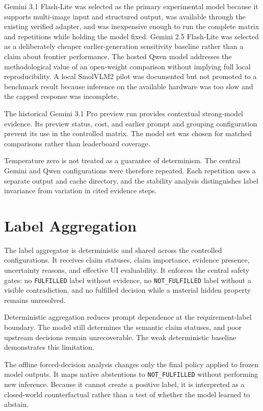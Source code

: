 Gemini 3.1 Flash-Lite was selected as the primary experimental model because it
supports multi-image input and structured output, was available through the
existing verified adapter, and was inexpensive enough to run the complete
matrix and repetitions while holding the model fixed. Gemini 2.5 Flash-Lite was
selected as a deliberately cheaper earlier-generation sensitivity baseline
rather than a claim about frontier performance. The hosted Qwen model addresses
the methodological value of an open-weight comparison without implying full
local reproducibility. A local SmolVLM2 pilot was documented but not promoted
to a benchmark result because inference on the available hardware was too slow
and the capped response was incomplete.

The historical Gemini 3.1 Pro preview run provides contextual strong-model
evidence. Its preview status, cost, and earlier prompt and grouping
configuration prevent its use in the controlled matrix. The model set was
chosen for matched comparisons rather than leaderboard coverage.

Temperature zero is not treated as a guarantee of determinism. The central
Gemini and Qwen configurations were therefore repeated. Each repetition uses a
separate output and cache directory, and the stability analysis distinguishes
label invariance from variation in cited evidence steps.

\section{Label Aggregation}\label{label-aggregation}

The label aggregator is deterministic and shared across the controlled
configurations. It receives claim statuses, claim importance, evidence
presence, uncertainty reasons, and effective UI evaluability. It enforces the
central safety gates: no \texttt{FULFILLED} label without evidence, no
\texttt{NOT\_FULFILLED} label without a visible contradiction, and no fulfilled
decision while a material hidden property remains unresolved.

Deterministic aggregation reduces prompt dependence at the requirement-label
boundary. The model still determines the semantic claim statuses, and poor
upstream decisions remain unrecoverable. The weak deterministic baseline
demonstrates this limitation.

The offline forced-decision analysis changes only the final policy applied to
frozen model outputs. It maps native abstentions to \texttt{NOT\_FULFILLED} without
performing new inference. Because it cannot create a positive label, it is
interpreted as a closed-world counterfactual rather than a test of whether the
model learned to abstain.

